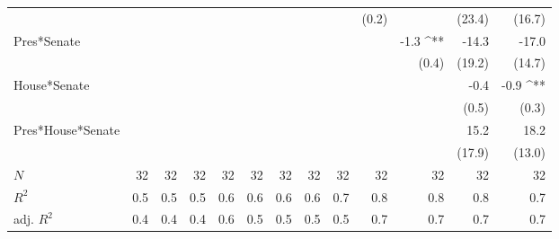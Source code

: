 \documentclass[a4paper]{article}\usepackage{graphicx, color}
\begin{document}
\begin{table}[ht]
\begin{center}
{\begin{tabular}{ l D{.}{.}{1}D{.}{.}{1}D{.}{.}{1}D{.}{.}{1}D{.}{.}{1}D{.}{.}{1}D{.}{.}{1}D{.}{.}{1}D{.}{.}{1}D{.}{.}{1}D{.}{.}{1}D{.}{.}{1} }
                     &                 &                 &                 &                 &                 &                 &                 &                 & (0.2)           &                 & (23.4)          & (16.7)         \\ 
Pres*Senate          &                 &                 &                 &                 &                 &                 &                 &                 &                 & -1.3 ^{**}      & -14.3           & -17.0          \\ 
                     &                 &                 &                 &                 &                 &                 &                 &                 &                 & (0.4)           & (19.2)          & (14.7)         \\ 
House*Senate         &                 &                 &                 &                 &                 &                 &                 &                 &                 &                 & -0.4            & -0.9 ^{**}     \\ 
                     &                 &                 &                 &                 &                 &                 &                 &                 &                 &                 & (0.5)           & (0.3)          \\ 
Pres*House*Senate    &                 &                 &                 &                 &                 &                 &                 &                 &                 &                 & 15.2            & 18.2           \\ 
                     &                 &                 &                 &                 &                 &                 &                 &                 &                 &                 & (17.9)          & (13.0)          \\
 $N$                  & 32              & 32              & 32              & 32              & 32              & 32              & 32              & 32              & 32              & 32              & 32              & 32             \\ 
$R^2$                & 0.5             & 0.5             & 0.5             & 0.6             & 0.6             & 0.6             & 0.6             & 0.7             & 0.8             & 0.8             & 0.8             & 0.7            \\ 
adj. $R^2$           & 0.4             & 0.4             & 0.4             & 0.6             & 0.5             & 0.5             & 0.5             & 0.5             & 0.7             & 0.7             & 0.7             & 0.7            \\ 

\end{tabular}}
\end{center}
\end{table}
\end{document}
